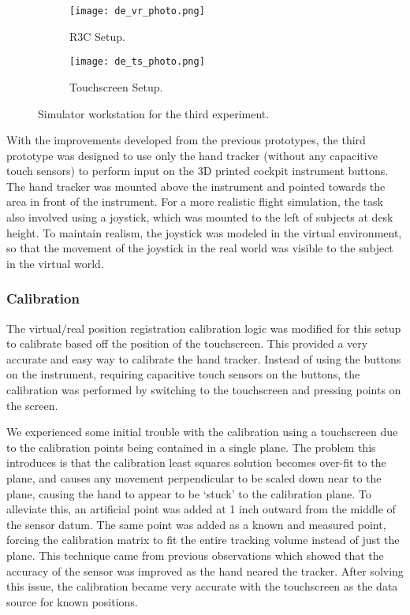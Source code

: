 \begin{figure}
    \centering
    \begin{subfigure}[t]{0.49\linewidth}
        \centering
        \texttt{[image: de\_vr\_photo.png]}
        \caption{R3C Setup.}
        \label{fig:proto_design_exp:vr}
    \end{subfigure}
    \begin{subfigure}[t]{0.49\linewidth}
        \centering
        \texttt{[image: de\_ts\_photo.png]}
        \caption{Touchscreen Setup.}
        \label{fig:proto_design_exp:ts}
    \end{subfigure}
    \caption{Simulator workstation for the third experiment.}
    \label{fig:proto_design_exp}
\end{figure}

With the improvements developed from the previous prototypes, the third prototype was designed to use only the hand tracker (without any capacitive touch sensors) to perform input on the 3D printed cockpit instrument buttons.
The hand tracker was mounted above the instrument and pointed towards the area in front of the instrument.
For a more realistic flight simulation, the task also involved using a joystick, which was mounted to the left of subjects at desk height.
To maintain realism, the joystick was modeled in the virtual environment, so that the movement of the joystick in the real world was visible to the subject in the virtual world.

\subsubsection{Calibration}

The virtual/real position registration calibration logic was modified for this setup to calibrate based off the position of the touchscreen.
This provided a very accurate and easy way to calibrate the hand tracker.
Instead of using the buttons on the instrument, requiring capacitive touch sensors on the buttons, the calibration was performed by switching to the touchscreen and pressing points on the screen.

We experienced some initial trouble with the calibration using a touchscreen due to the calibration points being contained in a single plane.
The problem this introduces is that the calibration least squares solution becomes over-fit to the plane, and causes any movement perpendicular to be scaled down near to the plane, causing the hand to appear to be `stuck' to the calibration plane.
To alleviate this, an artificial point was added at 1 inch outward from the middle of the sensor datum.
The same point was added as a known and measured point, forcing the calibration matrix to fit the entire tracking volume instead of just the plane.
This technique came from previous observations which showed that the accuracy of the sensor was improved as the hand neared the tracker.
After solving this issue, the calibration became very accurate with the touchscreen as the data source for known positions.


